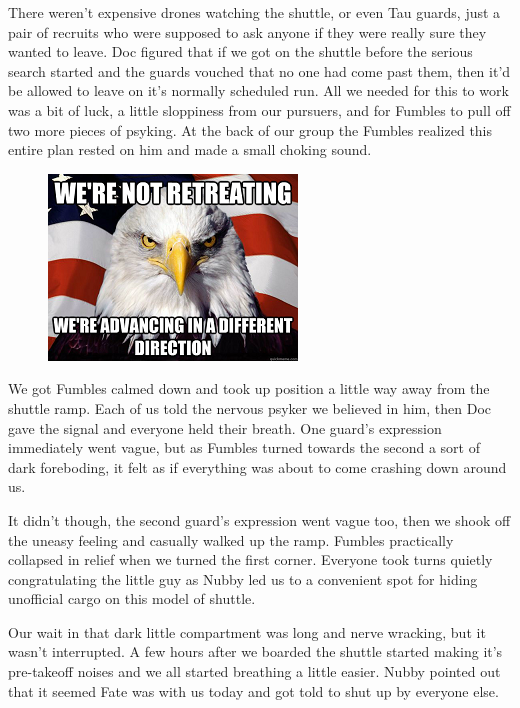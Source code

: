 There weren't expensive drones watching the shuttle, or even Tau guards, just a pair of recruits who were supposed to ask anyone if they were really sure they wanted to leave. 
Doc figured that if we got on the shuttle before the serious search started and the guards vouched that no one had come past them, then it'd be allowed to leave on it's normally scheduled run. 
All we needed for this to work was a bit of luck, a little sloppiness from our pursuers, and for Fumbles to pull off two more pieces of psyking. 
At the back of our group the Fumbles realized this entire plan rested on him and made a small choking sound.

\begin{figure}
	\begin{center}
		\includegraphics[width=\figwidth]{pics/10/54.png}
	\end{center}
\end{figure}
We got Fumbles calmed down and took up position a little way away from the shuttle ramp. 
Each of us told the nervous psyker we believed in him, then Doc gave the signal and everyone held their breath. 
One guard's expression immediately went vague, but as Fumbles turned towards the second a sort of dark foreboding, it felt as if everything was about to come crashing down around us.

It didn't though, the second guard's expression went vague too, then we shook off the uneasy feeling and casually walked up the ramp. 
Fumbles practically collapsed in relief when we turned the first corner. 
Everyone took turns quietly congratulating the little guy as Nubby led us to a convenient spot for hiding unofficial cargo on this model of shuttle. 


Our wait in that dark little compartment was long and nerve wracking, but it wasn't interrupted. 
A few hours after we boarded the shuttle started making it's pre-takeoff noises and we all started breathing a little easier. 
Nubby pointed out that it seemed Fate was with us today and got told to shut up by everyone else.

